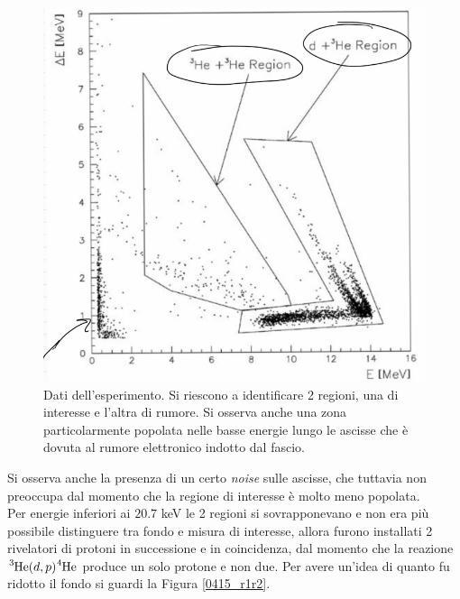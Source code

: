 \begin{figure}[!h]
	\centering
	\includegraphics[scale=0.5]{Immagini/0415_DE-E.png}
	\caption{Dati dell'esperimento. Si riescono a identificare 2 regioni, una di interesse e l'altra di rumore. Si osserva anche una zona particolarmente popolata nelle basse energie lungo le ascisse che è dovuta al rumore elettronico indotto dal fascio.}
	\label{0415_DEE}
\end{figure}

\noindent Si osserva anche la presenza di un certo \textit{noise} sulle ascisse, che tuttavia non preoccupa dal momento che la regione di interesse è molto meno popolata.\\
Per energie inferiori ai $20.7$ keV le 2 regioni si sovrapponevano e non era più possibile distinguere tra fondo e misura di interesse, allora furono installati 2 rivelatori di protoni in successione e in coincidenza, dal momento che la reazione $\ce{^3He}(d,p)\ce{^4He}$ produce un solo protone e non due. Per avere un'idea di quanto fu ridotto il fondo si guardi la Figura \ref{0415_r1r2}.

